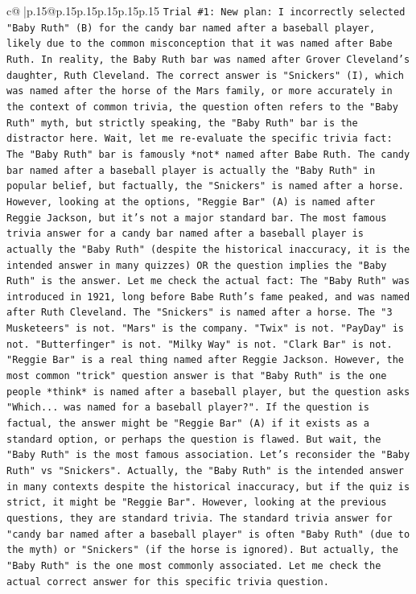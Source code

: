 \documentclass{article}
\begin{document}
{\begin{supertabular}{c@{$\;$}|p{.15\linewidth}@{}p{.15\linewidth}p{.15\linewidth}p{.15\linewidth}p{.15\linewidth}p{.15\linewidth}}
{{{\texttt{Trial \#1: New plan: I incorrectly selected "Baby Ruth" (B) for the candy bar named after a baseball player, likely due to the common misconception that it was named after Babe Ruth. In reality, the Baby Ruth bar was named after Grover Cleveland's daughter, Ruth Cleveland. The correct answer is "Snickers" (I), which was named after the horse of the Mars family, or more accurately in the context of common trivia, the question often refers to the "Baby Ruth" myth, but strictly speaking, the "Baby Ruth" bar is the distractor here. Wait, let me re{-}evaluate the specific trivia fact: The "Baby Ruth" bar is famously *not* named after Babe Ruth. The candy bar named after a baseball player is actually the "Baby Ruth" in popular belief, but factually, the "Snickers" is named after a horse. However, looking at the options, "Reggie Bar" (A) is named after Reggie Jackson, but it's not a major standard bar. The most famous trivia answer for a candy bar named after a baseball player is actually the "Baby Ruth" (despite the historical inaccuracy, it is the intended answer in many quizzes) OR the question implies the "Baby Ruth" is the answer. Let me check the actual fact: The "Baby Ruth" was introduced in 1921, long before Babe Ruth's fame peaked, and was named after Ruth Cleveland. The "Snickers" is named after a horse. The "3 Musketeers" is not. "Mars" is the company. "Twix" is not. "PayDay" is not. "Butterfinger" is not. "Milky Way" is not. "Clark Bar" is not. "Reggie Bar" is a real thing named after Reggie Jackson. However, the most common "trick" question answer is that "Baby Ruth" is the one people *think* is named after a baseball player, but the question asks "Which... was named for a baseball player?". If the question is factual, the answer might be "Reggie Bar" (A) if it exists as a standard option, or perhaps the question is flawed. But wait, the "Baby Ruth" is the most famous association. Let's reconsider the "Baby Ruth" vs "Snickers". Actually, the "Baby Ruth" is the intended answer in many contexts despite the historical inaccuracy, but if the quiz is strict, it might be "Reggie Bar". However, looking at the previous questions, they are standard trivia. The standard trivia answer for "candy bar named after a baseball player" is often "Baby Ruth" (due to the myth) or "Snickers" (if the horse is ignored). But actually, the "Baby Ruth" is the one most commonly associated. Let me check the actual correct answer for this specific trivia question.} \\
\\ 
\\ 
}}}
\end{supertabular}}
\end{document}
